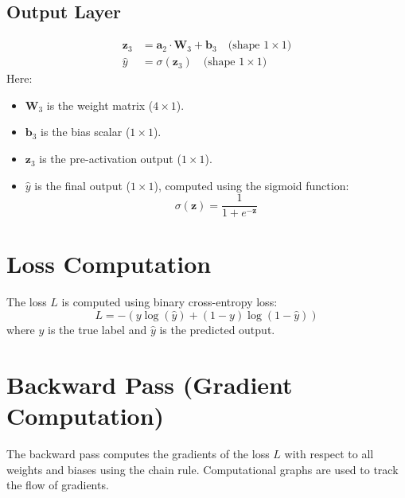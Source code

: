 \begin{notechapter}
\subsection{Output Layer}
\begin{align*}
    \bm{z}_3 &= \bm{a}_2 \cdot \bm{W}_3 + \bm{b}_3 \quad
    \text{(shape } 1 \times 1\text{)} \\
    \hat{y} &= \sigma(\bm{z}_3) \quad
    \text{(shape } 1 \times 1\text{)}
\end{align*}
Here:
\begin{itemize}[leftmargin=*]
    \item \(\bm{W}_3\) is the weight matrix (\(4 \times 1\)).
    \item \(\bm{b}_3\) is the bias scalar (\(1 \times 1\)).
    \item \(\bm{z}_3\) is the pre-activation output (\(1 \times 1\)).
    \item \(\hat{y}\) is the final output (\(1 \times 1\)), computed
    using the sigmoid function:
    \[
    \sigma(\bm{z}) = \frac{1}{1 + e^{-\bm{z}}}
    \]
\end{itemize}

\section{Loss Computation}
The loss \(L\) is computed using binary cross-entropy loss:
\[
L = -\left( y \log(\hat{y}) + (1 - y) \log(1 - \hat{y}) \right)
\]
where \(y\) is the true label and \(\hat{y}\) is the predicted output.

\section{Backward Pass (Gradient Computation)}
The backward pass computes the gradients of the loss \(L\) with respect
to all weights and biases using the chain rule. Computational graphs
are used to track the flow of gradients.


\end{notechapter}
